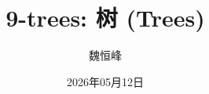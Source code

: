 \documentclass[]{beamer}
\title[9-trees: 树]{9-trees: 树 (Trees)}
\author[魏恒峰]{\large 魏恒峰}
\institute{hfwei@hnu.edu.cn}
\date{2026年05月12日}
\begin{document}
\maketitle





% 

\thankyou{}

\end{document}
